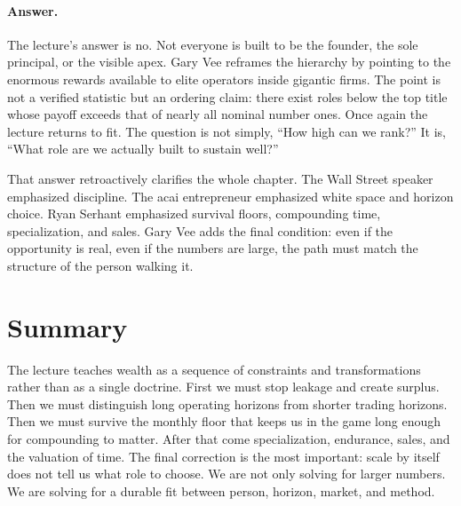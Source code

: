 \paragraph{Answer.} The lecture's answer is no. Not everyone is built to be the founder, the sole principal, or the visible apex. Gary Vee reframes the hierarchy by pointing to the enormous rewards available to elite operators inside gigantic firms. The point is not a verified statistic but an ordering claim: there exist roles below the top title whose payoff exceeds that of nearly all nominal number ones. Once again the lecture returns to fit. The question is not simply, ``How high can we rank?'' It is, ``What role are we actually built to sustain well?''

That answer retroactively clarifies the whole chapter. The Wall Street speaker emphasized discipline. The acai entrepreneur emphasized white space and horizon choice. Ryan Serhant emphasized survival floors, compounding time, specialization, and sales. Gary Vee adds the final condition: even if the opportunity is real, even if the numbers are large, the path must match the structure of the person walking it.

\section{Summary}

The lecture teaches wealth as a sequence of constraints and transformations rather than as a single doctrine. First we must stop leakage and create surplus. Then we must distinguish long operating horizons from shorter trading horizons. Then we must survive the monthly floor that keeps us in the game long enough for compounding to matter. After that come specialization, endurance, sales, and the valuation of time. The final correction is the most important: scale by itself does not tell us what role to choose. We are not only solving for larger numbers. We are solving for a durable fit between person, horizon, market, and method.